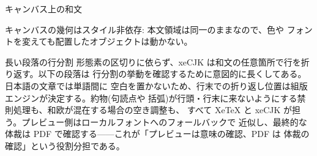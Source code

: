 \documentclass[aspectratio=169]{beamer}
\begin{document}
\begin{frame}[label=japanese-canvas]{キャンバス上の和文}
  \begin{deckcanvas}
    \begin{decktext}[x=0.050,y=0.150,w=0.500,size=normal]
      キャンバスの幾何はスタイル非依存: 本文領域は同一のままなので、色や
      フォントを変えても配置したオブジェクトは動かない。
    \end{decktext}
  \end{deckcanvas}
\end{frame}

\begin{frame}{長い段落の行分割}
  形態素の区切りに依らず、xeCJK は和文の任意箇所で行を折り返す。以下の段落は
  行分割の挙動を確認するために意図的に長くしてある。日本語の文章では単語間に
  空白を置かないため、行末での折り返し位置は組版エンジンが決定する。約物(句読点や
  括弧)が行頭・行末に来ないようにする禁則処理も、和欧が混在する場合の空き調整も、
  すべて XeTeX と xeCJK が担う。プレビュー側はローカルフォントへのフォールバックで
  近似し、最終的な体裁は PDF で確認する——これが「プレビューは意味の確認、PDF は
  体裁の確認」という役割分担である。
\end{frame}
\end{document}
